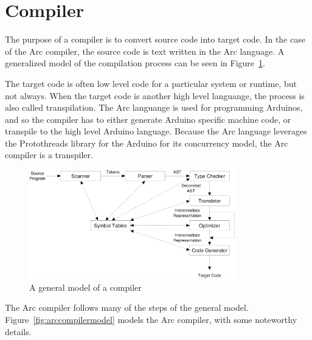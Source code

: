 \section{Compiler}\label{sec:compiler}
The purpose of a compiler is to convert source code into target code. In the case of the Arc compiler, the source code is text written in the Arc language. A generalized model of the compilation process can be seen in Figure~\ref{fig:generalcompilermodel}.

The target code is often low level code for a particular system or runtime, but not always. When the target code is another high level languange, the process is also called transpilation. The Arc languange is used for programming Arduinos, and so the compiler has to either generate Arduino specific machine code, or transpile to the high level Arduino language. Because the Arc language leverages the Protothreads library for the Arduino for its concurrency model, the Arc compiler is a transpiler.


\begin{figure}[htb!]
    \centering
    \includegraphics[width=0.8\textwidth]{figures/Full_Compiler.png}
    \caption{A general model of a compiler~\cite{CraftingCompiler}}
    \label{fig:generalcompilermodel}
\end{figure}


The Arc compiler follows many of the steps of the general model. Figure~\ref{fig:arccompilermodel} models the Arc compiler, with some noteworthy details.


